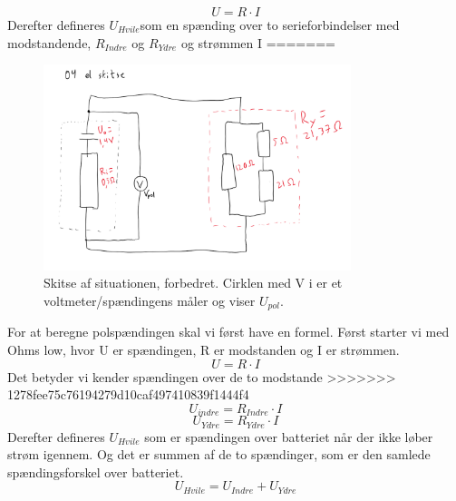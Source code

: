 \begin{equation*}
    U = R \cdot I
\end{equation*}
Derefter defineres \begin{math}U_{Hvile}\end{math}som en spænding over to serieforbindelser med modstandende, \begin{math}R_{Indre}\end{math} og \begin{math}R_{Ydre}\end{math} og strømmen I
=======
\begin{figure}[h!]
    \centering
    \includegraphics[width=0.8\textwidth]{figures/ellareskitseBille.png}
    \caption{Skitse af situationen, forbedret. Cirklen med V i er et voltmeter/spændingens måler og viser $U_{pol}$.}
\end{figure}
For at beregne polspændingen skal vi først have en formel.\newline
Først starter vi med Ohms low, hvor U er spændingen, R er modstanden og I er strømmen.
\begin{equation*}
    U = R \cdot I
\end{equation*}
Det betyder vi kender spændingen over de to modstande
>>>>>>> 1278fee75c76194279d10caf497410839f1444f4
\begin{equation*}
    U_{indre} = R_{Indre} \cdot I
\end{equation*}
\begin{equation*}
    U_{Ydre} = R_{Ydre} \cdot I
\end{equation*}
Derefter defineres $U_{Hvile}$ som er spændingen over batteriet når der ikke løber strøm igennem. Og det er summen af de to spændinger, som er den samlede spændingsforskel over batteriet.
\begin{equation*}
    U_{Hvile} = U_{Indre} + U_{Ydre}
\end{equation*}
